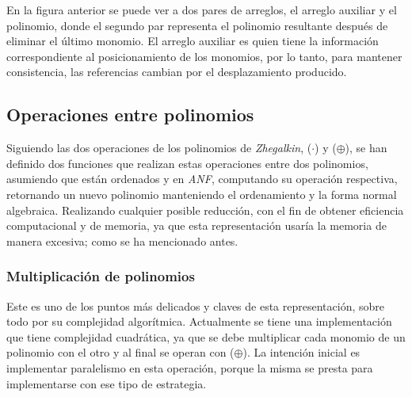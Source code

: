 En la figura anterior se puede ver a dos pares de arreglos, el arreglo auxiliar y el polinomio, donde el segundo par representa el polinomio resultante después de eliminar el último monomio. El arreglo auxiliar es quien tiene la información correspondiente al posicionamiento de los monomios, por lo tanto, para mantener consistencia, las referencias cambian por el desplazamiento producido.

\subsection{Operaciones entre polinomios}

Siguiendo las dos operaciones de los polinomios de \textit{Zhegalkin}, ($\cdot$) y ($\oplus$), se han definido dos funciones que realizan estas operaciones entre dos polinomios, asumiendo que están ordenados y en \textit{ANF}, computando su operación respectiva, retornando un nuevo polinomio manteniendo el ordenamiento y la forma normal algebraica. Realizando cualquier posible reducción, con el fin de obtener eficiencia computacional y de memoria, ya que esta representación usaría la memoria de manera excesiva; como se ha mencionado antes.

\subsubsection{Multiplicación de polinomios}

Este es uno de los puntos más delicados y claves de esta representación, sobre todo por su complejidad algorítmica. Actualmente se tiene una implementación que tiene complejidad cuadrática, ya que se debe multiplicar cada monomio de un polinomio con el otro y al final se operan con ($\oplus$). La intención inicial es implementar paralelismo en esta operación, porque la misma se presta para implementarse con ese tipo de estrategia.
